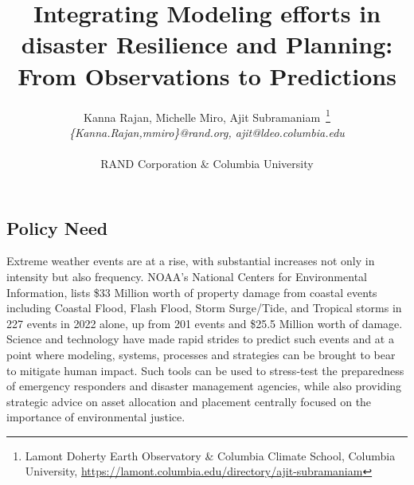 \documentclass[11pt,letterpaper]{article}
\title{\Large{Integrating Modeling efforts in disaster Resilience and Planning:\\
    From Observations to Predictions}}
\author{\normalsize{Kanna Rajan, Michelle Miro, Ajit
      Subramaniam~\footnote{Lamont Doherty Earth Observatory \&
        Columbia Climate School, \newline Columbia University,
        \url{https://lamont.columbia.edu/directory/ajit-subramaniam}}
    }\\
  \emph{\{Kanna.Rajan,mmiro\}@rand.org, ajit@ldeo.columbia.edu}\\ \\
  RAND Corporation \& Columbia University}
\begin{document}
\maketitle{}

\subsection*{Policy Need}

Extreme weather events are at a rise, with substantial increases not
only in intensity but also frequency. NOAA's National Centers for
Environmental Information, lists \$33 Million worth of property damage
from coastal events including Coastal Flood, Flash Flood, Storm
Surge/Tide, and Tropical storms in 227 events in 2022 alone, up from
201 events and \$25.5 Million worth of damage. Science and technology
have made rapid strides to predict such events and at a point where
modeling, systems, processes and strategies can be brought to bear to
mitigate human impact. Such tools can be used to stress-test the
preparedness of emergency responders and disaster management agencies,
while also providing strategic advice on asset allocation and
placement centrally focused on the importance of environmental
justice. 












% 
\end{document}
